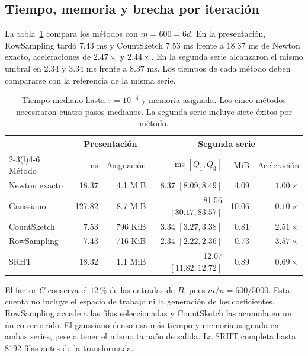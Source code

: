 \documentclass[11pt,a4paper]{article}
\begin{document}
\subsection{Tiempo, memoria y brecha por iteración}
La tabla~\ref{tab:main} compara los métodos con $m=600=6d$. En la presentación, RowSampling tardó $7.43$ ms y CountSketch $7.53$ ms frente a $18.37$ ms de Newton exacto, aceleraciones de $2.47\times$ y $2.44\times$. En la segunda serie alcanzaron el mismo umbral en $2.34$ y $3.34$ ms frente a $8.37$ ms. Los tiempos de cada método deben compararse con la referencia de la misma serie.
\begin{table}[htbp]\centering\small
\caption{Tiempo mediano hasta $\tau=10^{-4}$ y memoria asignada. Los cinco métodos necesitaron cuatro pasos medianos. La segunda serie incluye siete éxitos por método.}\label{tab:main}
\begin{tabular}{@{}lrr rrr@{}}\toprule
&\multicolumn{2}{c}{Presentación}&\multicolumn{3}{c}{Segunda serie}\\
\cmidrule(lr){2-3}\cmidrule(l){4-6}
Método & ms & Asignación & ms $[Q_1,Q_3]$ & MiB & Aceleración\\ \midrule
Newton exacto & 18.37 & 4.1 MiB & 8.37 $[8.09,8.49]$ & 4.09 & $1.00\times$\\
Gaussiano & 127.82 & 8.7 MiB & 81.56 $[80.17,83.57]$ & 10.06 & $0.10\times$\\
CountSketch & 7.53 & 796 KiB & 3.34 $[3.27,3.38]$ & 0.81 & $2.51\times$\\
RowSampling & 7.43 & 716 KiB & 2.34 $[2.22,2.36]$ & 0.73 & $3.57\times$\\
SRHT & 18.32 & 1.1 MiB & 12.07 $[11.82,12.72]$ & 0.89 & $0.69\times$\\
\bottomrule\end{tabular}
\end{table}

El factor $C$ conserva el $12\,\%$ de las entradas de $B$, pues $m/n=600/5000$. Esta cuenta no incluye el espacio de trabajo ni la generación de los coeficientes. RowSampling accede a las filas seleccionadas y CountSketch las acumula en un único recorrido. El gaussiano denso usa más tiempo y memoria asignada en ambas series, pese a tener el mismo tamaño de salida. La SRHT completa hasta 8192 filas antes de la transformada.
\end{document}
